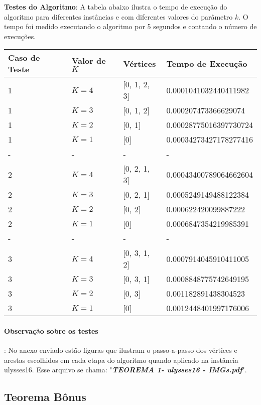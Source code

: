 \documentclass[paper=a4, fontsize=11pt]{scrartcl} %
\numberwithin{equation}{section} %
\numberwithin{figure}{section} %
\numberwithin{table}{section} %
\begin{document}
\textbf{Testes do Algoritmo}: A tabela abaixo ilustra o tempo de execução do algoritmo para diferentes instâncias e com diferentes valores do parâmetro $k$. O tempo foi medido executando o algoritmo por 5 segundos e contando o número de execuções.

\begin{table}[H]
\centering
\begin{tabular}{l|l|l|l}
Caso de Teste & Valor de $K$ & Vértices & Tempo de Execução \\ \hline
1 & $K = 4$ & [0, 1, 2, 3] & 0.0001041032440411982 \\
1 & $K = 3$ & [0, 1, 2] & 0.000207473366629074 \\
1 & $K = 2$ & [0, 1] & 0.00028775016397730724 \\
1 & $K = 1$ & [0] & 0.00034273427178277416 \\ 
- &    -    &  -  & - \\
2 & $K = 4$ & [0, 2, 1, 3] & 0.00043400789064662604 \\
2 & $K = 3$ & [0, 2, 1] & 0.0005249149488122384 \\
2 & $K = 2$ & [0, 2] & 0.000622420099887222 \\
2 & $K = 1$ & [0] & 0.0006847354219985391 \\
- &    -    &  -  & - \\
3 & $K = 4$ & [0, 3, 1, 2] & 0.0007914045910411005 \\
3 & $K = 3$ & [0, 3, 1] & 0.0008848775742649195 \\
3 & $K = 2$ & [0, 3] & 0.001182891438304523 \\
3 & $K = 1$ & [0] & 0.0012448401997176006 
\end{tabular}
\end{table}

\paragraph{Observação sobre os testes}: No anexo enviado estão figuras que ilustram o passo-a-passo dos vértices e arestas escolhidos em cada etapa do algoritmo quando aplicado na instância ulysses16. Esse arquivo se chama: "\emph{\textbf{TEOREMA 1- ulysses16 - IMGs.pdf}}".


\subsection{Teorema Bônus}
\end{document}
